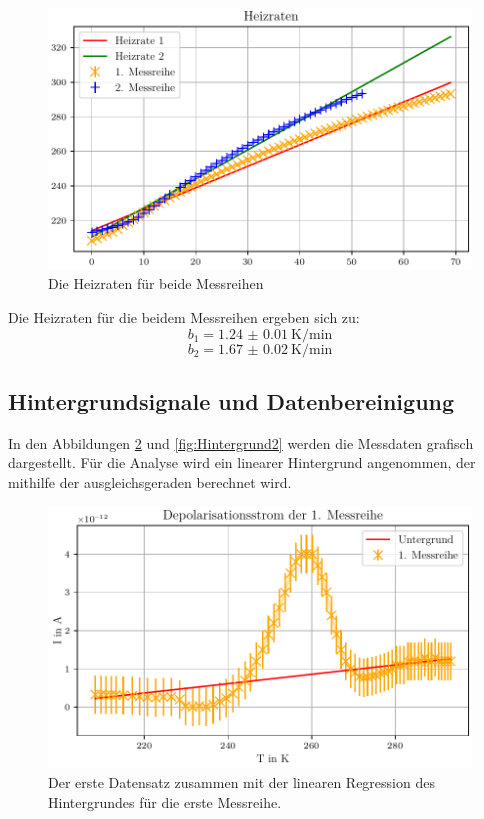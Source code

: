 \begin{figure}[H]
    \centering
    \includegraphics[width=\textwidth]{plots/A_heizraten.pdf}
    \caption{Die Heizraten für beide Messreihen}
    \label{fig:Heizraten}
\end{figure}

Die Heizraten für die beidem Messreihen ergeben sich zu:
\begin{equation}
b_1 =  \qty{1.24(1)}{\kelvin\per\minute}
\end{equation}
\begin{equation}
b_2 = \qty{1.67(2)}{\kelvin\per\minute}
\end{equation}

\subsection{Hintergrundsignale und Datenbereinigung}
In den Abbildungen \ref{fig:Hintergrund1} und \ref{fig:Hintergrund2} werden die Messdaten grafisch dargestellt.
Für die Analyse wird ein linearer Hintergrund angenommen, der mithilfe der ausgleichsgeraden berechnet wird.

\begin{figure}[H]
    \centering
    \includegraphics[width=\textwidth]{plots/B_messreihe1.pdf}
    \caption{Der erste Datensatz zusammen mit der linearen Regression des Hintergrundes für die erste Messreihe.}
    \label{fig:Hintergrund1}
\end{figure}

